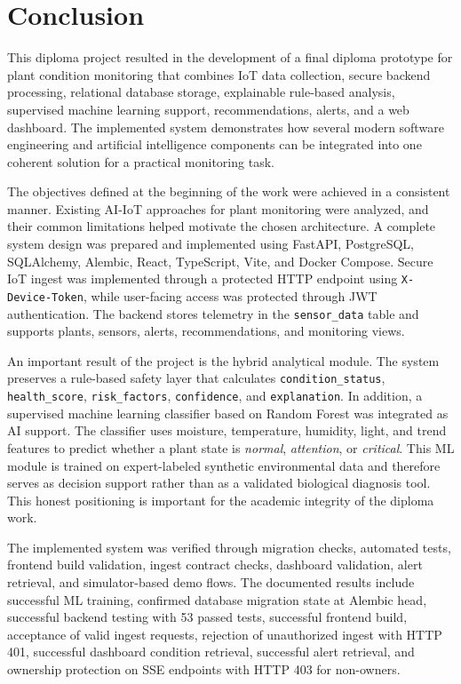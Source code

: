 \chapter{Conclusion}
\label{ch:conclusion}

This diploma project resulted in the development of a final diploma prototype for plant condition monitoring that combines IoT data collection, secure backend processing, relational database storage, explainable rule-based analysis, supervised machine learning support, recommendations, alerts, and a web dashboard. The implemented system demonstrates how several modern software engineering and artificial intelligence components can be integrated into one coherent solution for a practical monitoring task.

The objectives defined at the beginning of the work were achieved in a consistent manner. Existing AI-IoT approaches for plant monitoring were analyzed, and their common limitations helped motivate the chosen architecture. A complete system design was prepared and implemented using FastAPI, PostgreSQL, SQLAlchemy, Alembic, React, TypeScript, Vite, and Docker Compose. Secure IoT ingest was implemented through a protected HTTP endpoint using \texttt{X-Device-Token}, while user-facing access was protected through JWT authentication. The backend stores telemetry in the \texttt{sensor\_data} table and supports plants, sensors, alerts, recommendations, and monitoring views.

An important result of the project is the hybrid analytical module. The system preserves a rule-based safety layer that calculates \texttt{condition\_status}, \texttt{health\_score}, \texttt{risk\_factors}, \texttt{confidence}, and \texttt{explanation}. In addition, a supervised machine learning classifier based on Random Forest was integrated as AI support. The classifier uses moisture, temperature, humidity, light, and trend features to predict whether a plant state is \textit{normal}, \textit{attention}, or \textit{critical}. This ML module is trained on expert-labeled synthetic environmental data and therefore serves as decision support rather than as a validated biological diagnosis tool. This honest positioning is important for the academic integrity of the diploma work.

The implemented system was verified through migration checks, automated tests, frontend build validation, ingest contract checks, dashboard validation, alert retrieval, and simulator-based demo flows. The documented results include successful ML training, confirmed database migration state at Alembic head, successful backend testing with 53 passed tests, successful frontend build, acceptance of valid ingest requests, rejection of unauthorized ingest with HTTP 401, successful dashboard condition retrieval, successful alert retrieval, and ownership protection on SSE endpoints with HTTP 403 for non-owners.

